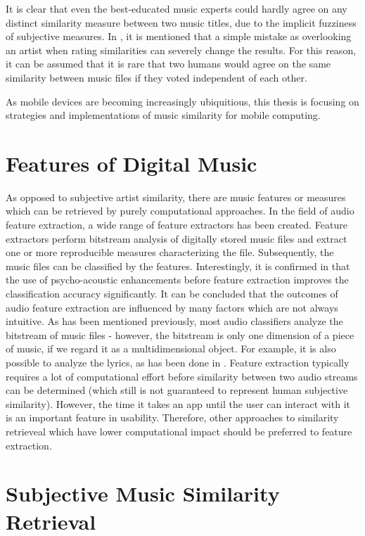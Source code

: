 It is clear that even the best-educated music experts could hardly agree on 
any distinct similarity measure between two music titles, due to the implicit fuzziness of subjective measures. In \cite{Ellis02thequest}, it is mentioned that a simple mistake as overlooking an artist when rating similarities can severely change the results.
For this reason, it can be assumed that it is rare that two humans would agree on the same similarity between music files
if they voted independent of each other.

As mobile devices are becoming increasingly ubiquitious, this thesis is focusing on strategies and implementations of music similarity for mobile computing.

\section{Features of Digital Music}

As opposed to subjective artist similarity, there are music features or measures which can be retrieved by
purely computational approaches. In the field of audio feature extraction, a wide range of feature extractors
has been created. Feature extractors perform bitstream analysis of digitally
stored music files and extract one or more reproducible measures characterizing the file. Subsequently, the music files can be classified by the features.
Interestingly, it is confirmed in \cite{LID_05ismir} that the use of psycho-acoustic enhancements before
feature extraction improves the classification accuracy significantly. It can be concluded that the outcomes of
audio feature extraction are influenced by many factors which are not always intuitive.
As has been mentioned previously, most audio classifiers analyze the bitstream of music files - however,
the bitstream is only one dimension of a piece of music, if we regard it as a multidimensional object. For example,
it is also possible to analyze the lyrics, as has been done in \cite{DBLP:conf/ismir/MayerNR08}. 
Feature extraction typically requires a lot of computational effort before similarity between two audio streams can be determined (which still is not guaranteed to represent human subjective similarity). However, the time it takes an app until the user can interact with it is an important feature in usability. Therefore, other approaches to similarity retrieveal which have lower computational impact should be preferred to feature extraction.

\section{Subjective Music Similarity Retrieval}

